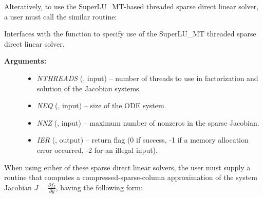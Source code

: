 \documentclass[letterpaper,10pt,english]{sphinxmanual}
\begin{document}
Alteratively, to use the SuperLU\_MT-based threaded sparse direct
linear solver, a user must call the similar {\hyperref[f_interface/Usage:f/_/FARKSUPERLUMT]{}}
routine:

\begin{fulllineitems}
\label{f_interface/Usage:f/_/FARKSUPERLUMT}
Interfaces with the {\hyperref[c_interface/User_callable:ARKSuperLUMT]{}} function
to specify use of the SuperLU\_MT threaded sparse direct linear solver.
\begin{description}
\item[{\textbf{Arguments:}}] \leavevmode\begin{itemize}
\item {} 
\emph{NTHREADS} (, input) -- number of threads to use in
factorization and solution of the Jacobian systems.

\item {} 
\emph{NEQ} (, input) -- size of the ODE system.

\item {} 
\emph{NNZ} (, input) -- maximum number of nonzeros in
the sparse Jacobian.

\item {} 
\emph{IER} (, output) -- return flag (0 if success, -1 if a
memory allocation error occurred, -2 for an illegal input).

\end{itemize}

\end{description}

\end{fulllineitems}


When using either of these sparse direct linear solvers, the user must
supply a routine that computes a compressed-sparse-column
approximation of the system Jacobian $J = \frac{\partial
f_I}{\partial y}$, having the following form:
\end{document}
